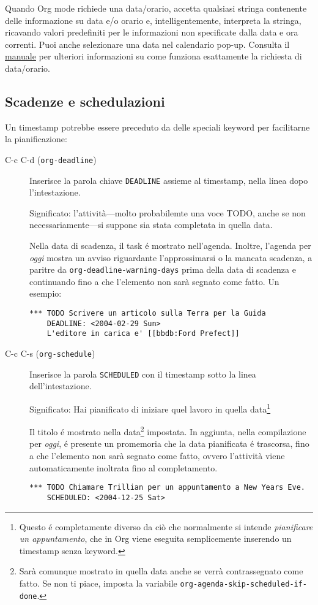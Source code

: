 \documentclass[11pt]{article}
\begin{document}
Quando Org mode richiede una data/orario, accetta qualsiasi stringa
contenente delle informazione su data e/o orario e,
intelligentemente, interpreta la stringa, ricavando valori predefiniti
per le informazioni non specificate dalla data e ora correnti. Puoi
anche selezionare una data nel calendario pop-up. Consulta il \href{org}{manuale}
per ulteriori informazioni su come funziona esattamente la richiesta
di data/orario.

\subsection{Scadenze e schedulazioni}
\label{sec:org0e40b68}
Un timestamp potrebbe essere preceduto da delle speciali keyword per
facilitarne la pianificazione:

\begin{description}
\item[{C-c C-d (\texttt{org-deadline})}] Inserisce la parola chiave \texttt{DEADLINE} assieme al timestamp, nella
linea dopo l'intestazione.

Significato: l'attività---molto probabilemte una voce TODO, anche se
non necessariamente---si suppone sia stata completata in quella
data.

Nella data di scadenza, il task é mostrato nell'agenda. Inoltre,
l'agenda per \emph{oggi} mostra un avviso riguardante l'approssimarsi o
la mancata scadenza, a paritre da \texttt{org-deadline-warning-days} prima
della data di scadenza e continuando fino a che l'elemento non sarà
segnato come fatto. Un esempio:

\begin{verbatim}
*** TODO Scrivere un articolo sulla Terra per la Guida
    DEADLINE: <2004-02-29 Sun>
    L'editore in carica e' [[bbdb:Ford Prefect]]
\end{verbatim}

\item[{C-c C-s (\texttt{org-schedule})}] Inserisce la parola \texttt{SCHEDULED} con il timestamp sotto la linea
dell'intestazione.

Significato: Hai pianificato di iniziare quel lavoro in quella data\footnote{Questo é completamente diverso da ciò che normalmente si intende
\emph{pianificare un appuntamento}, che in Org viene eseguita semplicemente
inserendo un timestamp senza keyword.}

Il titolo é mostrato nella data\footnote{Sarà comunque mostrato in quella data anche se verrà
contrassegnato come fatto. Se non ti piace, imposta la variabile
\texttt{org-agenda-skip-scheduled-if-done}.} impostata. In aggiunta, nella
compilazione per \emph{oggi}, é presente un promemoria che la data
pianificata é trascorsa, fino a che l'elemento non sarà segnato come
fatto, ovvero l'attività viene automaticamente inoltrata fino al
completamento.

\begin{verbatim}
*** TODO Chiamare Trillian per un appuntamento a New Years Eve.
    SCHEDULED: <2004-12-25 Sat>
\end{verbatim}
\end{description}
\end{document}
